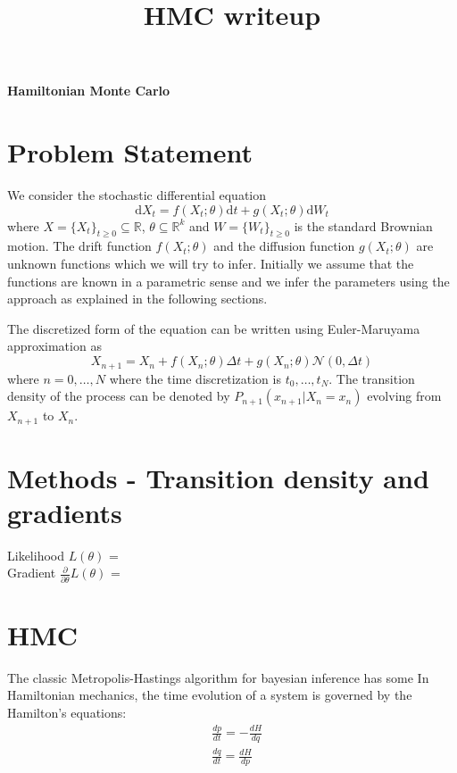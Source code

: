 \documentclass[a4paper,11pt]{article}
\begin{document}
\pagestyle{empty}
\title{HMC writeup}
\begin{center}
\Large\textbf{Hamiltonian Monte Carlo} \\[11pt]
\normalsize
\end{center}
\section{Problem Statement}
We consider the stochastic differential equation
\begin{equation}
\mathrm{d}X_t = f(X_t; \theta) \mathrm{d}t+ g(X_t; \theta) \mathrm{d}W_t
\end{equation}
where $X = \{X_t\}_{t \geq 0} \subseteq \mathbb{R}$, $\theta \subseteq \mathbb{R}^{k}$ and $W = \{W_t\}_{t \geq 0}$ is the standard Brownian motion. The drift function $f(X_t; \theta)$ and the diffusion function $g(X_t; \theta)$ are unknown functions which we will try to infer. Initially we assume that the functions are known in a parametric sense and we infer the parameters using the approach as explained in the following sections.

The discretized form of the equation can be written using Euler-Maruyama approximation as
\begin{equation}
X_{n+1} = X_{n} + f(X_n; \theta) \Delta t + g(X_n; \theta) \mathcal{N}(0, \Delta t)
\end{equation}
where $n = 0, \dots, N$ where the time discretization is $t_0, \dots, t_N$. The transition density of the process can be denoted by $P_{n+1}(x_{n+1} | X_n = x_n)$ evolving from $X_{n+1}$ to $X_{n}$. 

\section{Methods - Transition density and gradients}
Likelihood $L(\theta)$ = \\
Gradient $\frac{\partial}{\partial \theta} L(\theta)$ = 
\section{HMC}
The classic Metropolis-Hastings algorithm for bayesian inference has some 
In Hamiltonian mechanics, the time evolution of a system is governed by the Hamilton's equations:
\begin{align*}
& \frac{d p}{dt} = - \frac{dH}{dq} \\
& \frac{dq}{dt} = \frac{dH}{dp}
\end{align*}
\end{document}
